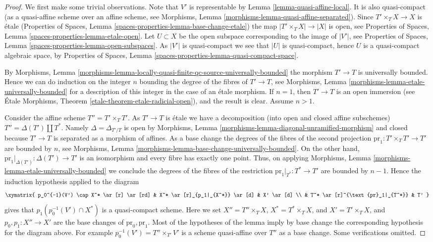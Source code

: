 \begin{proof}
We first make some trivial observations.
Note that $V'$ is representable by Lemma \ref{lemma-quasi-affine-local}.
It is also quasi-compact (as a quasi-affine scheme over an affine scheme, see
Morphisms, Lemma \ref{morphisms-lemma-quasi-affine-separated}).
Since $T' \times_T X \to X$ is \'etale
(Properties of Spaces, Lemma \ref{spaces-properties-lemma-base-change-etale})
the map $|T' \times_T X| \to |X|$ is open, see
Properties of Spaces, Lemma \ref{spaces-properties-lemma-etale-open}.
Let $U \subset X$ be the open subspace corresponding to the image of
$|V'|$, see
Properties of Spaces, Lemma \ref{spaces-properties-lemma-open-subspaces}.
As $|V'|$ is quasi-compact we see that $|U|$ is quasi-compact, hence
$U$ is a quasi-compact algebraic space, by
Properties of Spaces, Lemma \ref{spaces-properties-lemma-quasi-compact-space}.

\medskip\noindent
By
Morphisms,
Lemma \ref{morphisms-lemma-locally-quasi-finite-qc-source-universally-bounded}
the morphism $T' \to T$ is universally bounded. Hence we can do induction on
the integer $n$ bounding the degree of the fibres of $T' \to T$, see
Morphisms, Lemma \ref{morphisms-lemma-etale-universally-bounded}
for a description of this integer in the case of an \'etale morphism.
If $n = 1$, then $T' \to T$ is an open immersion (see
\'Etale Morphisms, Theorem \ref{etale-theorem-etale-radicial-open}),
and the result is clear. Assume $n > 1$.

\medskip\noindent
Consider the affine scheme $T'' = T' \times_T T'$.
As $T' \to T$ is \'etale we have a decomposition (into open and closed affine
subschemes) $T'' = \Delta(T') \amalg T^*$. Namely $\Delta = \Delta_{T'/T}$
is open by
Morphisms, Lemma \ref{morphisms-lemma-diagonal-unramified-morphism}
and closed because $T' \to T$ is separated as a morphism of affines.
As a base change the degrees of the fibres of the second projection
$\text{pr}_1 : T' \times_T T' \to T'$ are bounded by $n$, see
Morphisms, Lemma \ref{morphisms-lemma-base-change-universally-bounded}.
On the other hand, $\text{pr}_1|_{\Delta(T')} : \Delta(T') \to T'$ is
an isomorphism and every fibre has exactly one point.
Thus, on applying
Morphisms, Lemma \ref{morphisms-lemma-etale-universally-bounded}
we conclude the degrees of the fibres of the restriction
$\text{pr}_1|_{T^*} : T^* \to T'$ are bounded by $n - 1$.
Hence the induction hypothesis applied to the diagram
$$
\xymatrix{
p_0^{-1}(V') \cap X^* \ar[r] \ar[rd] &
X^* \ar[r]_{p_1|_{X^*}} \ar[d] &
X' \ar[d] \\
& T^* \ar[r]^{\text{pr}_1|_{T^*}} & T'
}
$$
gives that $p_1(p_0^{-1}(V') \cap X^*)$
is a quasi-compact scheme. Here we set
$X'' = T'' \times_T X$, $X^* = T^* \times_T X$, and $X' = T' \times_T X$,
and $p_0, p_1 : X'' \to X'$ are the base changes of $\text{pr}_0, \text{pr}_1$.
Most of the hypotheses of the lemma imply
by base change the corresponding hypothesis for the diagram above.
For example $p_0^{-1}(V') = T'' \times_{T'} V'$
is a scheme quasi-affine over $T''$ as a base change. Some
verifications omitted.


\end{proof}
